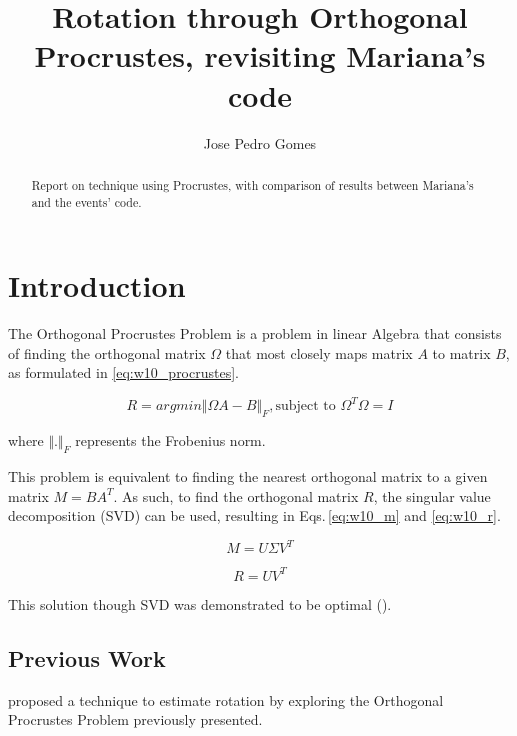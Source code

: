 \documentclass[10pt,twocolumn]{IEEEtran}
\begin{document}
\title{Rotation through Orthogonal Procrustes, revisiting Mariana's code}
\author{Jose Pedro Gomes}

\maketitle

\begin{abstract}
    Report on technique using Procrustes, with comparison of results between Mariana's \cite{mariana2019} and the events' code. 
\end{abstract}

\section{Introduction}

The Orthogonal Procrustes Problem is a problem in linear Algebra that consists of finding the orthogonal matrix $\Omega$ that most closely maps matrix $A$ to matrix $B$, as formulated in \eqref{eq:w10_procrustes}.

\begin{equation}
    \label{eq:w10_procrustes}
    R = arg min \Vert \Omega A - B \Vert _F, \text{subject to } \Omega^T\Omega=I
\end{equation}

where $ \Vert . \Vert _F$ represents the Frobenius norm.

This problem is equivalent to finding the nearest orthogonal matrix to a given matrix $M=BA^T$. As such, to find the orthogonal matrix $R$, the singular value decomposition (SVD) can be used, resulting in Eqs.\,\eqref{eq:w10_m} and \eqref{eq:w10_r}.

\begin{equation}
    \label{eq:w10_m}
    M=U\Sigma V^T
\end{equation}

\begin{equation}
    \label{eq:w10_r}
    R=UV^T
\end{equation}

This solution though SVD was demonstrated to be optimal (\cite{schonemann1966generalized}).

\subsection{Previous Work}

\cite{mariana2019} proposed a technique to estimate rotation by exploring the Orthogonal Procrustes Problem previously presented. 
\end{document}
